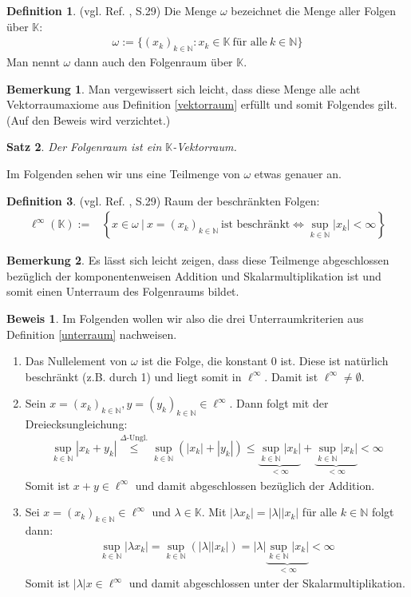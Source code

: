 \documentclass[10pt,a4paper]{article}
\theoremstyle{plain}
\newtheorem{satz}{Satz}[section]
\newenvironment{sa}{\begin{shaded}\begin{satz}}{\end{satz}\end{shaded}}
\theoremstyle{definition}
\newtheorem{definition}[satz]{Definition}
\newenvironment{dfi}{\begin{shaded}\begin{definition}}{\end{definition}\end{shaded}}
\theoremstyle{nonumberplain}
\newtheorem{bemerkung}{Bemerkung}
\newenvironment{bem}{\begin{bemerkung}}{\end{bemerkung}}
\newtheorem{beweis}{Beweis}
\newenvironment{bew}{\begin{beweis}}{\end{beweis}}
\newcommand{\N}{\mathbb{N}}
\newcommand{\K}{\mathbb{K}}
\begin{document}
\begin{dfi}
(vgl. Ref. \cite{Clason}, S.29) Die Menge $\omega$ bezeichnet die Menge aller Folgen über $\K$:
\begin{align*}
\omega := \{{(x_k)}_{k \in \N} : x_k \in \K \: \text{für alle} \: k \in \N\}
\end{align*}
Man nennt $\omega$ dann auch den Folgenraum über $\K$.
\end{dfi}
\begin{bem}
Man vergewissert sich leicht, dass diese Menge alle acht Vektorraumaxiome aus Definition \hyperref[vektorraum]{\ref*{vektorraum}} erfüllt und somit Folgendes gilt. (Auf den Beweis wird verzichtet.)
\end{bem}
\begin{sa}
\label{folgenraum-vektorraum}
Der Folgenraum ist ein $\K$-Vektorraum.
\end{sa}
Im Folgenden sehen wir uns eine Teilmenge von $\omega$ etwas genauer an. 
\begin{dfi}
(vgl. Ref. \cite{Clason}, S.29) Raum der beschränkten Folgen:
\begin{align*}
 \ell^\infty(\K) := &\left\{x \in \omega \: \big\vert \: x = {(x_k)}_{k \in \N} \: \text{ist beschränkt} \Leftrightarrow \sup_{k \in \N}{|x_k|} < \infty \right\}
\end{align*}
\end{dfi}
\begin{bem}
Es lässt sich leicht zeigen, dass diese Teilmenge abgeschlossen bezüglich der komponentenweisen Addition und Skalarmultiplikation ist und somit einen Unterraum des Folgenraums bildet.
\end{bem}
\begin{bew}
Im Folgenden wollen wir also die drei Unterraumkriterien aus Definition \hyperref[unterraum]{\ref*{unterraum}} nachweisen.
\begin{enumerate}[label=(\roman*)]
\item Das Nullelement von $\omega$ ist die Folge, die konstant 0 ist. Diese ist natürlich beschränkt (z.B. durch 1) und liegt somit in $\ell^\infty$. Damit ist $\ell^\infty \neq \emptyset$.
\item Sein $x = {(x_k)}_{k \in \N}, y = {(y_k)}_{k \in \N} \in \ell^\infty$. Dann folgt mit der Dreiecksungleichung:
\begin{align*}
\sup_{k \in \N}{|{x_k} + {y_k}|} \overset{\Delta\text{-Ungl.}}\leq  \sup_{k \in \N}{(|{x_k}| + |{y_k}|)} \leq \underbrace{\sup_{k \in \N}{|{x_k}|}}_{< \infty} + \underbrace{\sup_{k \in \N}{|{x_k}|}}_{< \infty} < \infty
\end{align*}
Somit ist $x + y \in \ell^\infty$ und damit abgeschlossen bezüglich der Addition.
\item Sei $x = {(x_k)}_{k \in \N} \in \ell^\infty$ und  $\lambda \in \K$. Mit $|\lambda x_k| = |\lambda| |x_k|$ für alle $k \in \N$ folgt dann:
\begin{align*}
\sup_{k \in \N}{|\lambda {x_k}|} = \sup_{k \in \N}{(|\lambda| |{x_k}|)} = |\lambda| \underbrace{\sup_{k \in \N}{|{x_k}|}}_{< \infty} < \infty
\end{align*}
Somit ist $|\lambda| x \in \ell^\infty$ und damit abgeschlossen unter der Skalarmultiplikation.
\end{enumerate}
\end{bew}
\end{document}
